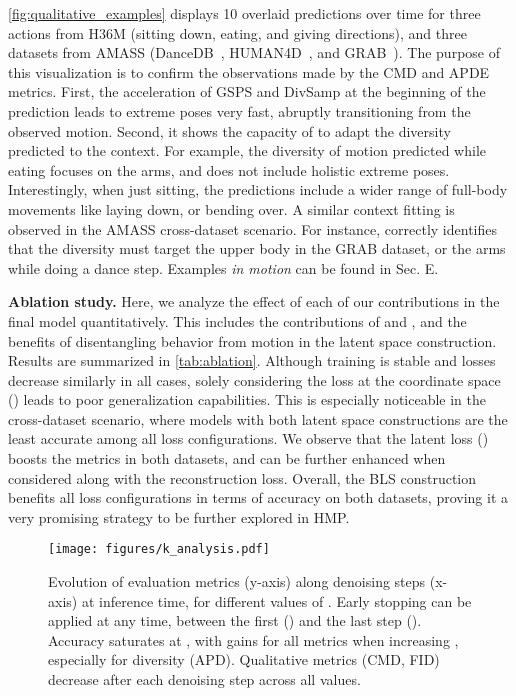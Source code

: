 \documentclass[10pt,twocolumn,letterpaper]{article}
\begin{document}
\autoref{fig:qualitative_examples} displays 10 overlaid predictions over time for three actions from H36M (sitting down, eating, and giving directions), and three datasets from AMASS (DanceDB~\cite{dancedb}, HUMAN4D~\cite{chatzitofis2020human4d}, and GRAB~\cite{taheri2020grab}). The purpose of this visualization is to confirm the observations made by the CMD and APDE metrics. First, the acceleration of GSPS and DivSamp at the beginning of the prediction leads to extreme poses very fast, abruptly transitioning from the observed motion. Second, it shows the capacity of \modelname{} to adapt the diversity predicted to the context. For example, the diversity of motion predicted while eating focuses on the arms, and does not include holistic extreme poses. Interestingly, when just sitting, the predictions include a wider range of full-body movements like laying down, or bending over. A similar context fitting is observed in the AMASS cross-dataset scenario. For instance, \modelname{} correctly identifies that the diversity must target the upper body in the GRAB dataset, or the arms while doing a dance step. Examples \textit{in motion} can be found in \supp{} Sec. E.






\textbf{Ablation study.} Here, we analyze the effect of each of our contributions in the final model quantitatively. This includes the contributions of  and , and the benefits of disentangling behavior from motion in the latent space construction. Results are summarized in \autoref{tab:ablation}. Although training is stable and losses decrease similarly in all cases, solely considering the loss at the coordinate space () leads to poor generalization capabilities. This is especially noticeable in the cross-dataset scenario, where models with both latent space constructions are the least accurate among all loss configurations. We observe that the latent loss () boosts the metrics in both datasets, and can be further enhanced when considered along with the reconstruction loss. Overall, the BLS construction benefits all loss configurations in terms of accuracy on both datasets, proving it a very promising strategy to be further explored in HMP.



\begin{figure*}[t!]
    \centering
    \texttt{[image: figures/k\_analysis.pdf]}
    \vspace{-0.4cm}
    \caption{Evolution of evaluation metrics (y-axis) along denoising steps (x-axis) at inference time, for different values of . Early stopping can be applied at any time, between the first () and the last step (). Accuracy saturates at , with gains for all metrics when increasing , especially for diversity (APD). Qualitative metrics (CMD, FID) decrease after each denoising step across all  values.}
    \label{fig:k_analysis}
    \vspace{-0.1cm}
\end{figure*}
\end{document}
